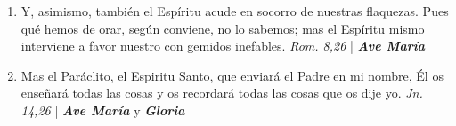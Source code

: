 \documentclass[../../devocionario.tex]{subfiles}
\begin{document}
\begin{enumerate}
        \item Y, asimismo, también el Espíritu acude en socorro de nuestras flaquezas. Pues qué hemos de orar, 
            según conviene, no lo sabemos; mas el Espíritu mismo interviene a favor nuestro con gemidos inefables. \textit{Rom. 8,26} | \textbf{\textit{Ave María}}

        \item Mas el Paráclito, el Espiritu Santo, que enviará el Padre en mi nombre, Él os enseñará todas las cosas y os recordará todas 
            las cosas que os dije yo. \textit{Jn. 14,26} | \textbf{\textit{Ave María}} y \textbf{\textit{Gloria}}

    \end{enumerate}
\end{document}
